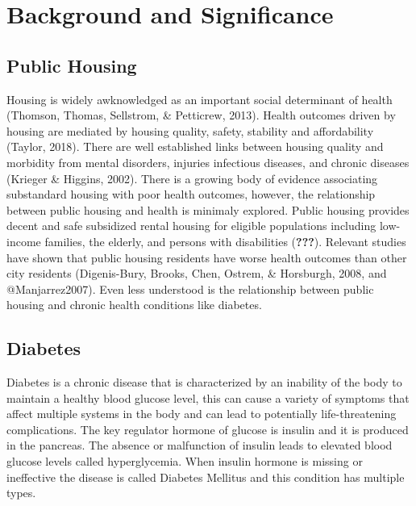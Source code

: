 \documentclass [11pt, proquest] {uwthesis}[2015/03/03]
\begin{document}
\titlepage
  \pagebreak


\copyrightpage

\setcounter{page}{-1}

\tableofcontents
\listoffigures
\listoftables



\textpages


\chapter{Background and Significance}\label{rmd-basics}

\section{Public Housing}\label{public-housing}

Housing is widely awknowledged as an important social determinant of
health (Thomson, Thomas, Sellstrom, \& Petticrew, 2013). Health outcomes
driven by housing are mediated by housing quality, safety, stability and
affordability (Taylor, 2018). There are well established links between
housing quality and morbidity from mental disorders, injuries infectious
diseases, and chronic diseases (Krieger \& Higgins, 2002). There is a
growing body of evidence associating substandard housing with poor
health outcomes, however, the relationship between public housing and
health is minimaly explored. Public housing provides decent and safe
subsidized rental housing for eligible populations including low-income
families, the elderly, and persons with disabilities ({\textbf{???}}).
Relevant studies have shown that public housing residents have worse
health outcomes than other city residents (Digenis-Bury, Brooks, Chen,
Ostrem, \& Horsburgh, 2008, and @Manjarrez2007). Even less understood is
the relationship between public housing and chronic health conditions
like diabetes.

\section{Diabetes}\label{diabetes}

Diabetes is a chronic disease that is characterized by an inability of
the body to maintain a healthy blood glucose level, this can cause a
variety of symptoms that affect multiple systems in the body and can
lead to potentially life-threatening complications. The key regulator
hormone of glucose is insulin and it is produced in the pancreas. The
absence or malfunction of insulin leads to elevated blood glucose levels
called hyperglycemia. When insulin hormone is missing or ineffective the
disease is called Diabetes Mellitus and this condition has multiple
types.
\end{document}
